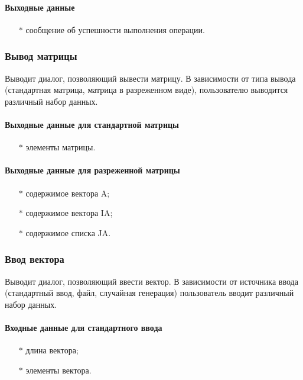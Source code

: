 \documentclass[a4paper,12pt]{extarticle}
\begin{document}
\paragraph{Выходные данные}
\begin{itemize}
    \item[$*$] сообщение об успешности выполнения операции.
\end{itemize}

\subsubsection{Вывод матрицы}
Выводит диалог, позволяющий вывести матрицу. В зависимости от типа вывода (стандартная матрица, матрица в разреженном виде), пользователю выводится различный набор данных.

\paragraph{Выходные данные для стандартной матрицы}
\begin{itemize}
    \item[$*$] элементы матрицы.
\end{itemize}

\paragraph{Выходные данные для разреженной матрицы}
\begin{itemize}
    \item[$*$] содержимое вектора A;
    \item[$*$] содержимое вектора IA;
    \item[$*$] содержимое списка JA.
\end{itemize}

\subsubsection{Ввод вектора}
Выводит диалог, позволяющий ввести вектор. В зависимости от источника ввода (стандартный ввод, файл, случайная генерация) пользователь вводит различный набор данных.

\paragraph{Входные данные для стандартного ввода}
\begin{itemize}
    \item[$*$] длина вектора;
    \item[$*$] элементы вектора.
\end{itemize}
\end{document}
